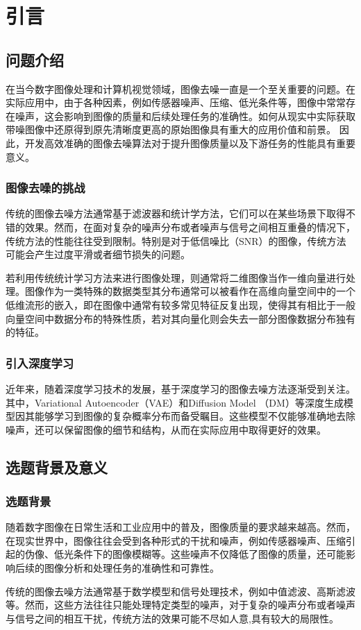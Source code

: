 \chapter{引言}
\section{问题介绍}

在当今数字图像处理和计算机视觉领域，图像去噪一直是一个至关重要的问题。在实际应用中，由于各种因素，例如传感器噪声、压缩、低光条件等，图像中常常存在噪声，这会影响到图像的质量和后续处理任务的准确性。如何从现实中实际获取带噪图像中还原得到原先清晰度更高的原始图像具有重大的应用价值和前景。
因此，开发高效准确的图像去噪算法对于提升图像质量以及下游任务的性能具有重要意义。
\subsection*{图像去噪的挑战}
传统的图像去噪方法通常基于滤波器和统计学方法，它们可以在某些场景下取得不错的效果。然而，在面对复杂的噪声分布或者噪声与信号之间相互重叠的情况下，传统方法的性能往往受到限制。特别是对于低信噪比（SNR）的图像，传统方法可能会产生过度平滑或者细节损失的问题。      

若利用传统统计学习方法来进行图像处理，则通常将二维图像当作一维向量进行处理。图像作为一类特殊的数据类型其分布通常可以被看作在高维向量空间中的一个低维流形的嵌入，即在图像中通常有较多常见特征反复出现，使得其有相比于一般向量空间中数据分布的特殊性质，若对其向量化则会失去一部分图像数据分布独有的特征。
\subsection*{引入深度学习}
近年来，随着深度学习技术的发展，基于深度学习的图像去噪方法逐渐受到关注。其中，Variational Autoencoder（VAE）和Diffusion Model （DM）等深度生成模型因其能够学习到图像的复杂概率分布而备受瞩目。这些模型不仅能够准确地去除噪声，还可以保留图像的细节和结构，从而在实际应用中取得更好的效果。
\section{选题背景及意义}

\subsection*{选题背景}
随着数字图像在日常生活和工业应用中的普及，图像质量的要求越来越高。然而，在现实世界中，图像往往会受到各种形式的干扰和噪声，例如传感器噪声、压缩引起的伪像、低光条件下的图像模糊等。这些噪声不仅降低了图像的质量，还可能影响后续的图像分析和处理任务的准确性和可靠性。\par 
传统的图像去噪方法通常基于数学模型和信号处理技术，例如中值滤波、高斯滤波等。然而，这些方法往往只能处理特定类型的噪声，对于复杂的噪声分布或者噪声与信号之间的相互干扰，传统方法的效果可能不尽如人意,具有较大的局限性。
